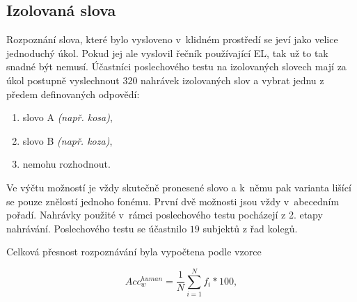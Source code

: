 \subsection{Izolovaná slova}
\label{chap:realisation:listening:isolated}

Rozpoznání slova, které bylo vysloveno v~klidném prostředí se jeví jako velice jednoduchý úkol.
Pokud jej ale vyslovil řečník používající EL, tak už to tak snadné být nemusí.
Účastníci poslechového testu na izolovaných slovech mají za úkol postupně vyslechnout $320$ nahrávek izolovaných slov a vybrat jednu z předem definovaných odpovědí:

\begin{enumerate}[label=\alph*)]
  \item slovo A \textit{(např. kosa)},
  \item slovo B \textit{(např. koza)},
  \item nemohu rozhodnout.
\end{enumerate}

\noindent Ve výčtu možností je vždy skutečně pronesené slovo a  k~němu pak varianta lišící se pouze znělostí jednoho fonému. První dvě možnosti jsou vždy v~abecedním pořadí. Nahrávky použité v~rámci poslechového testu pocházejí z 2. etapy nahrávání. Poslechového testu se účastnilo $19$ subjektů z řad kolegů.

Celková přesnost rozpoznávání byla vypočtena podle vzorce

\begin{equation}
  Acc_w^{human} = \frac{1}{N} \sum_{i=1}^{N} f_i * 100,
  \label{eq:realisation:accuracy:human}
\end{equation}

